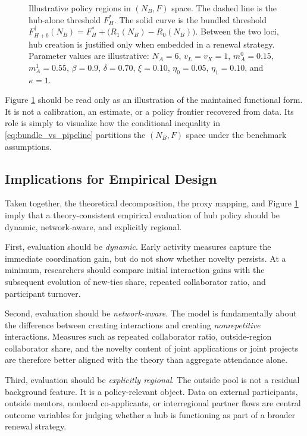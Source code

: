 \begin{figure}[htbp]
\caption{Illustrative policy regions in $(N_B,F)$ space. The dashed line is the hub-alone threshold $F_H^*$. The solid curve is the bundled threshold $F_{H+b}^{\dagger}(N_B)=F_H^*+\bigl(R_1(N_B)-R_0(N_B)\bigr)$. Between the two loci, hub creation is justified only when embedded in a renewal strategy. Parameter values are illustrative: $N_A=6$, $v_L=v_X=1$, $m_A^0=0.15$, $m_A^1=0.55$, $\beta=0.9$, $\delta=0.70$, $\xi=0.10$, $\eta_0=0.05$, $\eta_1=0.10$, and $\kappa=1$.}
\label{fig:rrr_policy_regions}
\end{figure}

Figure \ref{fig:rrr_policy_regions} should be read only as an illustration of the maintained functional form. It is not a calibration, an estimate, or a policy frontier recovered from data. Its role is simply to visualize how the conditional inequality in \eqref{eq:bundle_vs_pipeline} partitions the $(N_B,F)$ space under the benchmark assumptions.

\subsection{Implications for Empirical Design}

Taken together, the theoretical decomposition, the proxy mapping, and Figure \ref{fig:rrr_policy_regions} imply that a theory-consistent empirical evaluation of hub policy should be dynamic, network-aware, and explicitly regional.

First, evaluation should be \emph{dynamic}. Early activity measures capture the immediate coordination gain, but do not show whether novelty persists. At a minimum, researchers should compare initial interaction gains with the subsequent evolution of new-ties share, repeated collaborator ratio, and participant turnover.

Second, evaluation should be \emph{network-aware}. The model is fundamentally about the difference between creating interactions and creating \emph{nonrepetitive} interactions. Measures such as repeated collaborator ratio, outside-region collaborator share, and the novelty content of joint applications or joint projects are therefore better aligned with the theory than aggregate attendance alone.

Third, evaluation should be \emph{explicitly regional}. The outside pool is not a residual background feature. It is a policy-relevant object. Data on external participants, outside mentors, nonlocal co-applicants, or interregional partner flows are central outcome variables for judging whether a hub is functioning as part of a broader renewal strategy.

